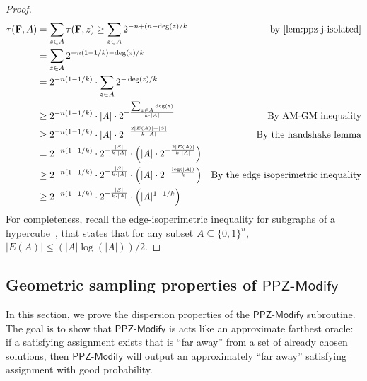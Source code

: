 \documentclass[11pt, letterpaper]{article}
\theoremstyle{definition}
\newcommand{\f}{\mathbf{F}}
\newcommand{\PPZMod}{\textsf{PPZ-Modify}}
\begin{document}
\begin{proof}
\begin{align}
\tau(\f,A) & = \sum_{z \in A} \tau(\f, z) \geq \sum_{z \in A} 2^{-n + (n - \deg(z) / k} & \text{by~\Cref{lem:ppz-j-isolated}} \notag \\
& = \sum_{z \in A} 2^{-n(1-1/k)  - \deg(z) / k} & \notag \\
& = 2^{-n(1-1/k)} \cdot \sum_{z \in A}   2^{- \deg(z) / k} & \notag \\
& \geq 2^{-n(1-1/k)} \cdot |A| \cdot  2^{-\frac{\sum_{z \in A} \deg(z)}{k \cdot |A|}} & \text{By AM-GM inequality} \notag \\
 & \geq 2^{-n(1-1/k)} \cdot |A| \cdot  2^{- \frac{2|E(A)| + |S|}{k \cdot |A|}} & \text{By the handshake lemma} \notag \\
 & = 2^{-n(1-1/k)} \cdot 2^{-\frac{|S|}{k \cdot |A|}} \cdot \left(|A| \cdot 2^{-\frac{2 |E(A)|}{k \cdot |A|}}\right) & \notag \\
 & \geq 2^{-n(1-1/k)} \cdot 2^{-\frac{|S|}{k \cdot |A|}} \cdot \left(|A| \cdot 2^{-\frac{\log (|A|)}{k}}\right) & \text{By the edge isoperimetric inequality}\notag \\
 & \geq 2^{-n(1-1/k)} \cdot 2^{-\frac{|S|}{k \cdot |A|}} \cdot \left(|A|^{1-1/k} \right) &\notag 
\end{align}
For completeness, recall the edge-isoperimetric inequality for subgraphs of a hypercube~\cite{bollobas1986combinatorics}, that states that for any subset $A \subseteq \{0,1\}^n$, $|E(A)| \leq (|A| \log(|A|))/2$. 
\end{proof}

\subsection{Geometric sampling properties of $\PPZMod$} \label{sec:geometric}
In this section, we prove the dispersion properties of the $\PPZMod$ subroutine. The goal is to show that $\PPZMod$ is acts like an approximate farthest oracle: if a satisfying assignment exists that is ``far away'' from a set of already chosen solutions, then $\PPZMod$ will output an approximately ``far away'' satisfying assignment with good probability. 
\end{document}
